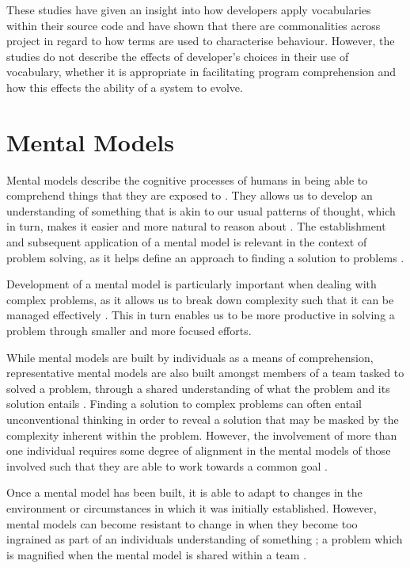 These studies have given an insight into how developers apply vocabularies within their source code and have shown that there are commonalities across project in regard to how terms are used to characterise behaviour. However, the studies do not describe the effects of developer's choices in their use of vocabulary, whether it is appropriate in facilitating program comprehension and how this effects the ability of a system to evolve.


\section{Mental Models} %
\label{sec:mental_models}

Mental models describe the cognitive processes of humans in being able to comprehend things that they are exposed to \cite{Gentner83a}. They allows us to develop an understanding of something that is akin to our usual patterns of thought, which in turn, makes it easier and more natural to reason about \cite{Johnson86a}. The establishment and subsequent application of a mental model is relevant in the context of problem solving, as it helps define an approach to finding a solution to problems \cite{Johnson86a}.

Development of a mental model is particularly important when dealing with complex problems, as it allows us to break down complexity such that it can be managed effectively \cite{Johnson86a}. This in turn enables us to be more productive in solving a problem through smaller and more focused efforts.

While mental models are built by individuals as a means of comprehension, representative mental models are also built amongst members of a team tasked to solved a problem, through a shared understanding of what the problem and its solution entails \cite{Mathieu00a}. Finding a solution to complex problems can often entail unconventional thinking in order to reveal a solution that may be masked by the complexity inherent within the problem. However, the involvement of more than one individual requires some degree of alignment in the mental models of those involved such that they are able to work towards a common goal \cite{Lim06a}.

Once a mental model has been built, it is able to adapt to changes in the environment or circumstances in which it was initially established. However, mental models can become resistant to change in when they become too ingrained as part of an individuals understanding of something \cite{Johnson86a}; a problem which is magnified when the mental model is shared within a team \cite{Lim06a}.

